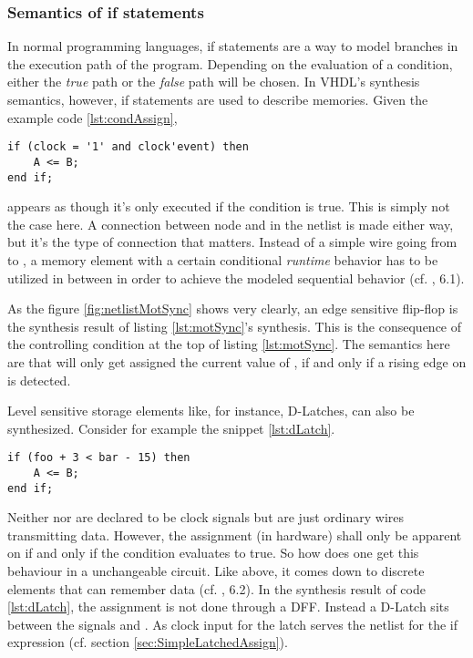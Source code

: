 \subsubsection{Semantics of if statements}

In normal programming languages, if statements are a way to model
branches in the execution path of the program. Depending on the
evaluation of a condition, either the \emph{true} path or the
\emph{false} path will be chosen. In VHDL's synthesis semantics,
however, if statements are used to describe memories.
Given the example code \ref{lst:condAssign},
%
\begin{lstlisting}[style=vhdl,caption={Simple conditional assignment},
   label={lst:condAssign}]
if (clock = '1' and clock'event) then
    A <= B;
end if;
\end{lstlisting}
%
 appears as though it's only executed if the condition is
true. This is simply not the case here. A connection between node
 and  in the netlist is made either way, but it's the type
of connection that matters. Instead of a simple wire going from 
to , a memory element with a certain conditional \emph{runtime}
behavior has to be utilized in between in order to achieve the
modeled sequential behavior (cf. \cite{IEEESYNTH}, 6.1).

As the figure \ref{fig:netlistMotSync} shows very clearly, an edge
sensitive flip-flop is
the synthesis result of listing \ref{lst:motSync}'s synthesis. This is the
consequence of the controlling  condition at the top of listing
\ref{lst:motSync}. The semantics here are that  will only get
assigned the current value of , if and only if a rising edge on
 is detected.

Level sensitive storage elements like, for instance, D-Latches, can also
be synthesized. Consider for example the snippet \ref{lst:dLatch}.
%
\begin{lstlisting}[style=vhdl, caption={Simple D-Latch being
      utilized}, label={lst:dLatch}]
if (foo + 3 < bar - 15) then
    A <= B;
end if;
\end{lstlisting}
%
Neither  nor  are declared to be clock signals but are
just ordinary wires transmitting data. However, the assignment (in
hardware) shall only be apparent on  if and only if the
condition evaluates to true. So how does one get this behaviour in a
unchangeable circuit. Like above, it comes down to discrete elements
that can remember data (cf. \cite{IEEESYNTH}, 6.2). In the synthesis
result of code \ref{lst:dLatch}, the assignment is not done through a
DFF. Instead a D-Latch sits between the signals  and
. As clock input for the latch serves the netlist for the if
expression  (cf. section
\ref{sec:SimpleLatchedAssign}).

